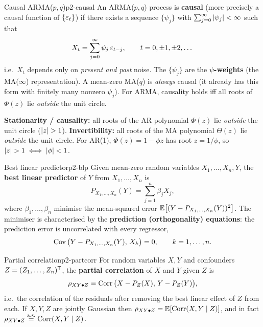 \begin{definition}{Causal ARMA($p,q$)}{p2-causal}
An ARMA($p,q$) process is \textbf{causal} (more precisely a causal function of
$\{\varepsilon_t\}$) if there exists a sequence $\{\psi_j\}$ with
$\sum_{j=0}^{\infty}\left\lvert \psi_j \right\rvert<\infty$ such that
\[
X_t=\sum_{j=0}^{\infty}\psi_j\,\varepsilon_{t-j},
\qquad t=0,\pm1,\pm2,\dots
\]
i.e.\ $X_t$ depends only on \emph{present and past} noise. The $\{\psi_j\}$ are
the \textbf{$\psi$-weights} (the MA($\infty$) representation). A mean-zero
MA($q$) is \emph{always} causal (it already has this form with finitely many
nonzero $\psi_j$). For ARMA, causality holds iff all roots of $\Phi(z)$ lie
\emph{outside} the unit circle.
\end{definition}

\begin{recallbox}
\textbf{Stationarity / causality:} all roots of the AR polynomial $\Phi(z)$ lie
\emph{outside} the unit circle ($\left\lvert z \right\rvert>1$). \textbf{Invertibility:} all roots
of the MA polynomial $\Theta(z)$ lie \emph{outside} the unit circle. For AR(1),
$\Phi(z)=1-\phi z$ has root $z=1/\phi$, so $\left\lvert z \right\rvert>1\iff\left\lvert \phi \right\rvert<1$.
\end{recallbox}

\begin{definition}{Best linear predictor}{p2-blp}
Given mean-zero random variables $X_1,\dots,X_n,Y$, the \textbf{best linear
predictor} of $Y$ from $X_1,\dots,X_n$ is
\[
P_{X_1,\dots,X_n}(Y)=\sum_{j=1}^{n}\beta_j X_j,
\]
where $\beta_1,\dots,\beta_n$ minimise the mean-squared error
$\mathbb{E}\big[(Y-P_{X_1,\dots,X_n}(Y))^2\big]$. The minimiser is characterised by the
\textbf{prediction (orthogonality) equations}: the prediction error is
uncorrelated with every regressor,
\[
\operatorname{Cov}\big(Y-P_{X_1,\dots,X_n}(Y),\,X_k\big)=0,\qquad k=1,\dots,n .
\]
\end{definition}

\begin{definition}{Partial correlation}{p2-partcorr}
For random variables $X,Y$ and confounders $Z=(Z_1,\dots,Z_n)^{\mathsf{T}}$, the
\textbf{partial correlation} of $X$ and $Y$ given $Z$ is
\[
\rho_{XY\bullet Z}=\operatorname{Corr}\big(X-P_Z(X),\,Y-P_Z(Y)\big),
\]
i.e.\ the correlation of the residuals after removing the best linear effect of
$Z$ from each. If $X,Y,Z$ are jointly Gaussian then
$\rho_{XY\bullet Z}=\mathbb{E}[\operatorname{Corr}(X,Y\mid Z)]$, and in fact
$\rho_{XY\bullet Z}\overset{\text{a.s.}}{=}\operatorname{Corr}(X,Y\mid Z)$.
\end{definition}

